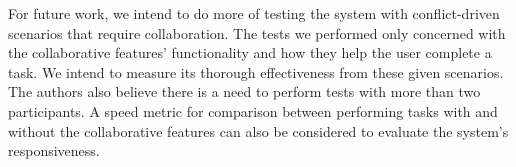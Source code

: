 For future work, we intend to do more of testing the system with conflict-driven scenarios that require collaboration. The tests we performed only concerned with the collaborative features' functionality and how they help the user complete a task. We intend to measure its thorough effectiveness from these given scenarios. The authors also believe there is a need to perform tests with more than two participants. A speed metric for comparison between performing tasks with and without the collaborative features can also be considered to evaluate the system's responsiveness. 

